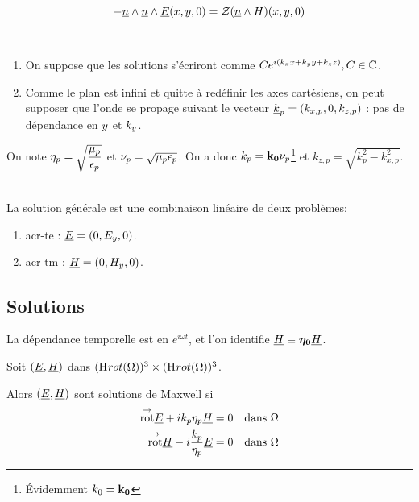 \begin{equation}
\label{eq:coeff_ref:intro:ci}
-\underline{n} \wedge \underline{n} \wedge \underline{E}({x},{y},0) = \mathcal{Z}( \underline{n} \wedge H)({x},{y},0)
\end{equation}

\begin{hyp}{}~\\
\begin{enumerate}
    \item On suppose que les solutions s'écriront comme $Ce^{i(k_{x}{x} +k_{y}{y}+k_{z}{z})}, C\in\mathbb C$.
    \item Comme le plan est infini et quitte à redéfinir les axes cartésiens, on peut supposer que l'onde se propage suivant le vecteur $\underline{k}_p = (k_{{x},p},0,k_{{z},p})$ : pas de dépendance en ${y}$ et $k_{y}$.
\end{enumerate}
\end{hyp}

On note $\eta_p = \sqrt{\dfrac{\mu_p}{\epsilon_p}}$ et $\nu_p = \sqrt{\mu_p \epsilon_p}$.
On a donc $k_p = \mathbf{k_0}\nu_p$\footnote{Évidemment $k_0 = \mathbf{k_0}$} et $k_{z,p} = \sqrt{k_p^2 - k_{x,p}^2}$.

\begin{hyp}{}~\\
La solution générale est une combinaison linéaire de deux problèmes: 
\begin{enumerate}
    \item \gls{acr-te} : $\underline{E} = (0,E_y,0)$.
    \item \gls{acr-tm} : $\underline{H} = (0,H_y,0)$. 
\end{enumerate}
\end{hyp}

\subsection{Solutions}

\begin{tcolorbox}
\centering
La dépendance temporelle est en $e^{i \omega t}$, et l'on identifie $\underline{H} \equiv \boldsymbol{\eta_0} \underline{H}$.
\end{tcolorbox}


Soit $(\underline{E},\underline{H})$ dans $(\mathrm{H}_\mathrm{{}}{rot}(\Omega))^3 \times (\mathrm{H}_\mathrm{{}}{rot}(\Omega))^3$. 

Alors $(\underline{E},\underline{H})$ sont solutions de Maxwell si 
\begin{align}
\label{eq:coeffs_ref:maxwell-E}
{{\overset{\rightarrow}{\operatorname{rot}}}} \underline{E} + i k_p \eta_p \underline{H} &= 0 && \text{dans $\Omega$}\\
\label{eq:coeffs_ref:maxwell-H}
{{\overset{\rightarrow}{\operatorname{rot}}}} \underline{H} - i \dfrac{k_p}{\eta_p} \underline{E} &= 0 && \text{dans $\Omega$}
\end{align}

